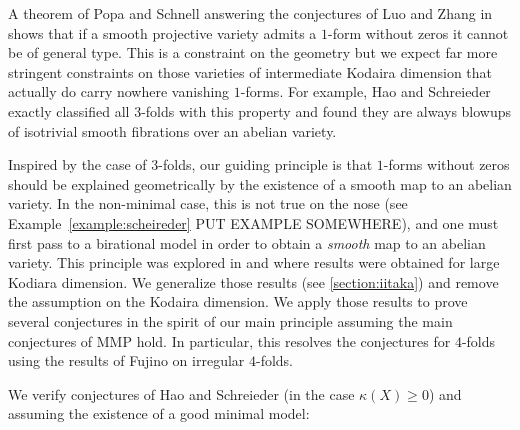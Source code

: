 \documentclass[12pt]{article}
\begin{document}
A theorem of Popa and Schnell \cite{PS14} answering the conjectures of Luo and Zhang in \cite{LZ05} shows that if a smooth projective variety admits a $1$-form without zeros it cannot be of general type. This is a constraint on the geometry but we expect far more stringent constraints on those varieties of intermediate Kodaira dimension that actually do carry nowhere vanishing $1$-forms. For example, Hao and Schreieder exactly classified all $3$-folds with this property \cite{HS21(1)} and found they are always blowups of isotrivial smooth fibrations over an abelian variety. 
\par
Inspired by the case of $3$-folds, our guiding principle is that $1$-forms without zeros should be explained geometrically by the existence of a smooth map to an abelian variety. In the non-minimal case, this is not true on the nose (see Example~\ref{example:scheireder} {\color{red} PUT EXAMPLE SOMEWHERE}), and one must first pass to a birational model in order to obtain a \textit{smooth} map to an abelian variety. This principle was explored in \cite{Hao23} and \cite{CCH23} where results were obtained for large Kodiara dimension. We generalize those results (see \ref{section:iitaka}) and remove the assumption on the Kodaira dimension. We apply those results to prove several conjectures in the spirit of our main principle assuming the main conjectures of MMP hold. In particular, this resolves the conjectures for $4$-folds using the results of Fujino \cite{Fuj10} on irregular $4$-folds.
\par 
We verify conjectures of Hao and Schreieder \cite[Conjecture 1.7]{HS21(1)} (in the case $\kappa(X) \ge 0$) and \cite[Conjecture 1.8]{HS21(1)} assuming the existence of a good minimal model:
\end{document}
